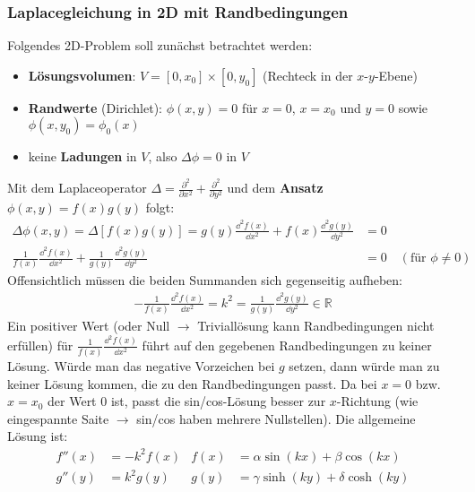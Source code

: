   \subsubsection{Laplacegleichung in 2D mit Randbedingungen}
		   Folgendes 2D-Problem soll zunächst betrachtet werden:
		        \begin{itemize}
			        \item \textbf{Lösungsvolumen}: $ V = [0,x_0] \times [0,y_0]$ (Rechteck in der $x$-$y$-Ebene)
			        \item \textbf{Randwerte} (Dirichlet): $\phi(x,y) = 0$ für $x=0$, $x=x_0$ und $y=0$ sowie $\phi(x,y_0) = \phi_0(x)$
			        \item keine \textbf{Ladungen} in $V$, also $\boxed{\Delta \phi = 0 \text{ in } V}$
		        \end{itemize}
		   Mit dem Laplaceoperator $\Delta = \frac{\partial^2}{\partial x^2} + \frac{\partial^2}{\partial y^2}$ und dem \textbf{Ansatz} $\phi (x,y) = f(x)g(y)$
		        folgt:
		        \begin{equation}\begin{split}
				        \Delta \phi(x,y)   = \Delta \left[f(x)g(y)\right] = g(y)\frac{\dd^2 f(x)}{\dd x^2} + f(x)\frac{\dd^2 g(y)}{\dd y^2} &= 0\\
				        \frac{1}{f(x)}\frac{\dd^2 f(x)}{\dd x^2} + \frac{1}{g(y)}\frac{\dd^2 g(y)}{\dd y^2} &= 0\quad (\text{für } \phi\neq 0)
			        \end{split}\end{equation}
		   Offensichtlich müssen die beiden Summanden sich gegenseitig aufheben:
		        \begin{equation}\begin{split}
				        \boxed{- \frac{1}{f(x)}\frac{\dd^2 f(x)}{\dd x^2}  = k^2 =  \frac{1}{g(y)}\frac{\dd^2 g(y)}{\dd y^2}} \in \mathbb{R}
			        \end{split}\end{equation}
		   Ein positiver Wert (oder Null $\to$ Triviallösung kann Randbedingungen nicht erfüllen) für $\frac{1}{f(x)}\frac{\dd^2 f(x)}{\dd x^2}$ führt auf den gegebenen Randbedingungen zu keiner Lösung. Würde man das negative Vorzeichen bei $g$ setzen, dann würde man zu keiner Lösung kommen, die zu den Randbedingungen passt. Da bei $x=0$ bzw. $x=x_0$ der Wert 0 ist, passt die sin/cos-Lösung besser zur $x$-Richtung (wie eingespannte Saite $\to$ sin/cos haben mehrere Nullstellen). Die allgemeine Lösung ist:
		        \begin{align}
			        f''(x) & = - k^2 f(x) & f(x) & = \alpha \sin(kx) + \beta \cos(kx)  \\
			        g''(y) & = k^2 g(y)   & g(y) & = \gamma\sinh(ky) + \delta\cosh(ky)
		        \end{align}

